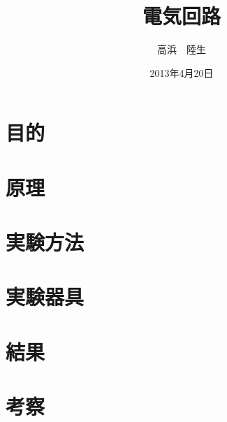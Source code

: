 \documentclass[a4j,10pt]{jarticle}
\title{電気回路}
\author{高浜　陸生}
\date{2013年4月20日}
\begin{document}
\section{目的}

\section{原理}

\section{実験方法}

\section{実験器具}

\section{結果}

\section{考察}
\end{document}
